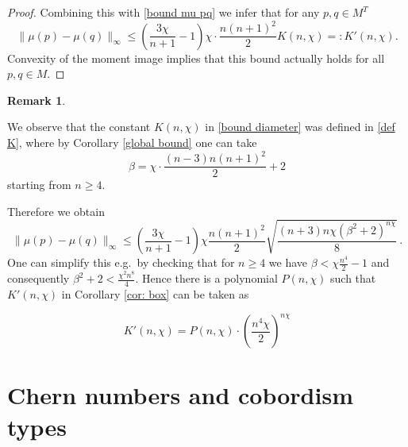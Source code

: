\documentclass[12pt,a4paper]{amsart}
\theoremstyle{plain}
\theoremstyle{definition}
\newtheorem{rem}[thm]{Remark}
\begin{document}
\begin{proof}
Combining this with \eqref{bound mu pq} we infer that for any $p,q\in M^T$
\begin{equation}\label{bound diameter}
\|\mu(p)-\mu(q)\|_\infty\leq \left(\frac{3\chi}{n+1}-1\right)\chi\cdot\frac{n(n+1)^2}{2} K(n,\chi)=: K'(n,\chi).
\end{equation}
Convexity of the moment image implies that this bound actually holds for all $p,q\in M$.
\end{proof}


\begin{rem}\label{rem better bound}

We observe that the constant $K(n,\chi)$ in \eqref{bound diameter} was defined in \eqref{def K}, where by Corollary \ref{global bound} one can take 
\[\beta = \chi\cdot \frac{(n-3)n(n+1)^2}{2}+2\]
starting from $n\geq 4$.

Therefore we obtain
$$
\|\mu(p)-\mu(q)\|_\infty\leq \left(\frac{3\chi}{n+1}-1\right)\chi\frac{n(n+1)^2}{2} \sqrt{\frac{(n+3)n\chi(\beta^2+2)^{n\chi}}{8}}\,.
$$
One can simplify this e.g.\ by checking that for $n\geq 4$ we have $\beta< \chi \frac{n^4}{2}-1$ and consequently $\beta^2+2< \frac{\chi^2 n^8}{4}$. Hence there is a polynomial $P(n,\chi)$ such that $K'(n,\chi)$ in Corollary \ref{cor: box} can be taken as

\[K'(n,\chi)= P(n,\chi)\cdot\left(\frac{ n^4\chi}{2}\right)^{n\chi}\]

\end{rem}


\section{Chern numbers and cobordism types}
\end{document}
